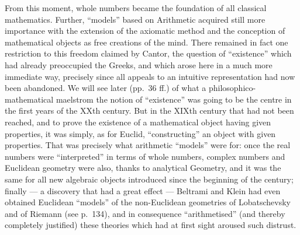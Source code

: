 From this moment, whole numbers became the foundation of all classical mathematics. Further, ``models'' based on Arithmetic acquired still more importance with the extension of the axiomatic method and the conception of mathematical objects as free creations of the mind. There remained in fact one restriction to this freedom claimed by Cantor, the question of ``existence'' which had already preoccupied the Greeks, and which arose here in a much more immediate way, precisely since all appeals to an intuitive representation had now been abandoned. We will see later (pp.~36 ff.) of what a philosophico-mathematical maelstrom the notion of ``existence'' was going to be the centre in the first years of the XXth century. But in the XIXth century that had not been reached, and to prove the existence of a mathematical object having given properties, it was simply, as for Euclid, ``constructing'' an object with given properties. That was precisely what arithmetic ``models'' were for: once the real numbers were ``interpreted'' in terms of whole numbers, complex numbers and Euclidean geometry were also, thanks to analytical Geometry, and it was the same for all new algebraic objects introduced since the beginning of the century; finally --- a discovery that had a great effect --- Beltrami and Klein had even obtained Euclidean ``models'' of the non-Euclidean geometries of Lobatschevsky and of Riemann (see p.~134), and in consequence ``arithmetised'' (and thereby completely justified) these theories which had at first sight aroused such distrust.

